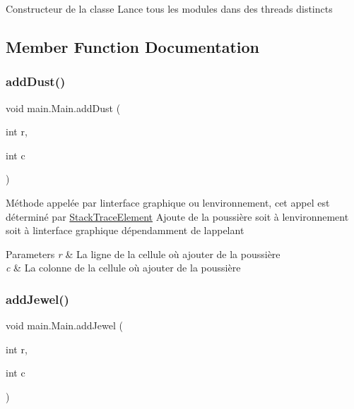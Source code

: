 Constructeur de la classe Lance tous les modules dans des threads distincts 

\subsection{Member Function Documentation}
\hypertarget{classmain_1_1_main_a07fa4830b941140965687c3a2dc8c2e9}{}\label{classmain_1_1_main_a07fa4830b941140965687c3a2dc8c2e9} 
\subsubsection{\texorpdfstring{add\+Dust()}{addDust()}}
{\footnotesize\ttfamily void main.\+Main.\+add\+Dust (\begin{DoxyParamCaption}\item[{int}]{r,  }\item[{int}]{c }\end{DoxyParamCaption})}

Méthode appelée par l\textquotesingle{}interface graphique ou l\textquotesingle{}environnement, cet appel est déterminé par \hyperlink{}{Stack\+Trace\+Element} Ajoute de la poussière soit à l\textquotesingle{}environnement soit à l\textquotesingle{}interface graphique dépendamment de l\textquotesingle{}appelant 
\begin{DoxyParams}{Parameters}
{\em r} & La ligne de la cellule où ajouter de la poussière \\
\hline
{\em c} & La colonne de la cellule où ajouter de la poussière \\
\hline
\end{DoxyParams}
\hypertarget{classmain_1_1_main_aaa7affd0b1ef80da03008902969da99b}{}\label{classmain_1_1_main_aaa7affd0b1ef80da03008902969da99b} 
\subsubsection{\texorpdfstring{add\+Jewel()}{addJewel()}}
{\footnotesize\ttfamily void main.\+Main.\+add\+Jewel (\begin{DoxyParamCaption}\item[{int}]{r,  }\item[{int}]{c }\end{DoxyParamCaption})}

